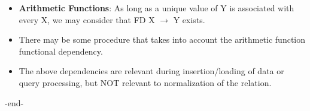 \documentclass[12pt, landscape]{article}
\begin{document}
\begin{multicols*}{3}
\begin{itemize}
\item \textbf{Arithmetic Functions}: As long as a unique value of Y is associated with every X, we may consider that FD X $\rightarrow$ Y exists. 
\item There may be some procedure that takes into account the arithmetic function functional dependency.
\item The above dependencies are relevant during insertion/loading of data 
or query processing, but NOT relevant to normalization of the relation.
\end{itemize}

\smallskip
\centerline{-end-}












\end{multicols*}
\end{document}
